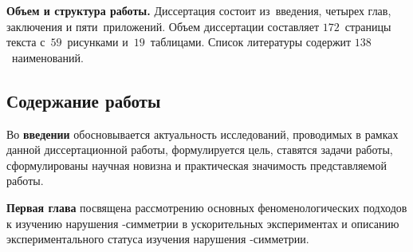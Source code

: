 {\textbf{Объем и структура работы.}} Диссертация состоит из~введения, четырех глав, заключения и пяти~приложений. Объем диссертации составляет $172$~страницы текста с~$59$~рисунками и~$19$~таблицами. Список литературы содержит $138$~наименований.


\subsection*{Содержание работы}
Во {\textbf{введении}} обосновывается актуальность исследований, проводимых в рамках данной диссертационной работы, формулируется цель, ставятся задачи работы, сформулированы научная новизна и практическая значимость представляемой работы.

{\textbf{Первая глава}} посвящена рассмотрению основных феноменологических подходов к изучению нарушения \cpconj-симметрии в ускорительных экспериментах и описанию экспериментального статуса изучения нарушения \cpconj-симметрии.


